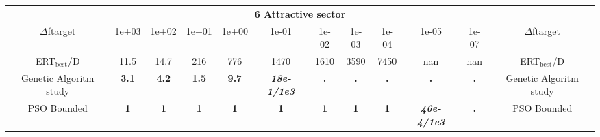 \begin{tabular}{cccccccccccc}
 & \multicolumn{10}{c}{{\normalsize \textbf{6 Attractive sector}}}\\
$\Delta$ftarget& 1e+03& 1e+02& 1e+01& 1e+00& 1e-01& 1e-02& 1e-03& 1e-04& 1e-05& 1e-07 & $\Delta$ftarget \\
ERT$_{\textrm{best}}$/D& 11.5& 14.7& 216& 776& 1470& 1610& 3590& 7450& nan& nan & ERT$_{\textrm{best}}$/D \\
\hline
Genetic Algoritm study & \textbf{3.1} & \textbf{4.2} & \textbf{1.5} & \textbf{9.7} & \textbf{\textit{18e-1}\textit{/1e3}} & \textbf{.} & \textbf{.} & \textbf{.} & \textbf{.} & \textbf{.} & Genetic Algoritm study \cite{add_an_entry_for_Genetic Algoritm study_in_bbob.bib}\\
PSO Bounded & \textbf{1} & \textbf{1} & \textbf{1} & \textbf{1} & \textbf{1} & \textbf{1} & \textbf{1} & \textbf{1} & \textbf{\textit{46e-4}\textit{/1e3}} & \textbf{.} & PSO Bounded \cite{add_an_entry_for_PSO Bounded_in_bbob.bib}
\end{tabular}
